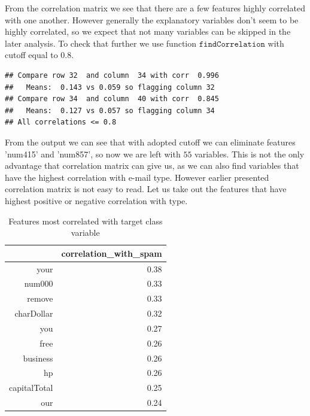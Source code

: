\documentclass{article}\usepackage[]{graphicx}\usepackage[]{xcolor}
\makeatletter
\newenvironment{kframe}{%
 \def\at@end@of@kframe{}%
 \ifinner\ifhmode%
  \def\at@end@of@kframe{\end{minipage}}%
  \begin{minipage}{\columnwidth}%
 \fi\fi%
 \def\FrameCommand##1{\hskip\@totalleftmargin \hskip-\fboxsep
 \colorbox{shadecolor}{##1}\hskip-\fboxsep
     \hskip-\linewidth \hskip-\@totalleftmargin \hskip\columnwidth}%
 \MakeFramed {\advance\hsize-\width
   \@totalleftmargin\z@ \linewidth\hsize
   \@setminipage}}%
 {\par\unskip\endMakeFramed%
 \at@end@of@kframe}
\newenvironment{knitrout}{}{} %
\makeatother
\begin{document}
From the correlation matrix we see that there are a few features highly correlated 
with one another. However generally the explanatory variables don't seem to be highly correlated, 
so we expect that not many variables can be skipped in the later analysis. 
To check that further we use function $\texttt{findCorrelation}$ with cutoff equal to $0.8$.
\begin{knitrout}
\color{fgcolor}\begin{kframe}
\begin{verbatim}
## Compare row 32  and column  34 with corr  0.996 
##   Means:  0.143 vs 0.059 so flagging column 32 
## Compare row 34  and column  40 with corr  0.845 
##   Means:  0.127 vs 0.057 so flagging column 34 
## All correlations <= 0.8
\end{verbatim}
\end{kframe}
\end{knitrout}
From the output we can see that with adopted cutoff we can eliminate features 'num415' 
and 'num857', so now we are left with $55$ variables. This is not the only advantage 
that correlation matrix can give us, as we can also find variables that have the highest 
correlation with e-mail type. However earlier presented correlation matrix is not easy to read. 
Let us take out the features that have highest positive or negative correlation with type.



\begin{table}[ht]
\centering
\begin{tabular}{rr}
  \hline
 & correlation\_with\_spam \\ 
  \hline
your & 0.38 \\ 
  num000 & 0.33 \\ 
  remove & 0.33 \\ 
  charDollar & 0.32 \\ 
  you & 0.27 \\ 
  free & 0.26 \\ 
  business & 0.26 \\ 
  hp & 0.26 \\ 
  capitalTotal & 0.25 \\ 
  our & 0.24 \\ 
   \hline
\end{tabular}
\caption{Features most correlated with target class variable} 
\label{tab2}
\end{table}
\end{document}
